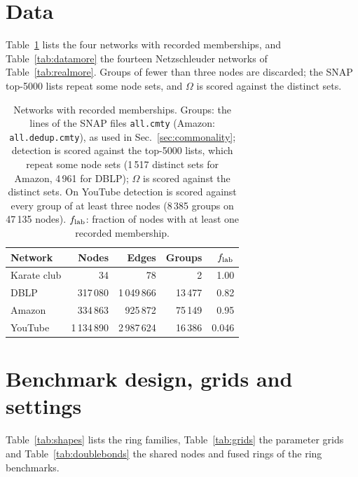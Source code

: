 \section{Data}
\label{app:data}

Table~\ref{tab:data} lists the four networks with recorded memberships, and
Table~\ref{tab:datamore} the fourteen Netzschleuder networks of Table~\ref{tab:realmore}.
Groups of fewer than three nodes are discarded; the SNAP top-5000 lists repeat some node
sets, and $\Omega$ is scored against the distinct sets.

\begin{table}[h]
\caption{Networks with recorded memberships. Groups: the lines of the SNAP files
\texttt{all.cmty} (Amazon: \texttt{all.dedup.cmty}), as used in Sec.~\ref{sec:commonality};
detection is scored against the top-5000 lists, which repeat some node sets (1\,517
distinct sets for Amazon, 4\,961 for DBLP); $\Omega$ is scored against the distinct
sets. On YouTube detection is scored against every group of at least three nodes
(8\,385 groups on 47\,135 nodes). $f_{\rm lab}$: fraction of nodes with at least one
recorded membership.}
\label{tab:data}
\begin{ruledtabular}
\begin{tabular}{lrrrr}
Network & Nodes & Edges & Groups & $f_{\rm lab}$ \\
\hline
Karate club & 34 & 78 & 2 & 1.00 \\
DBLP & 317\,080 & 1\,049\,866 & 13\,477 & 0.82 \\
Amazon & 334\,863 & 925\,872 & 75\,149 & 0.95 \\
YouTube & 1\,134\,890 & 2\,987\,624 & 16\,386 & 0.046 \\
\end{tabular}
\end{ruledtabular}
\end{table}



\section{Benchmark design, grids and settings}
\label{app:design}

Table~\ref{tab:shapes} lists the ring families, Table~\ref{tab:grids} the parameter grids
and Table~\ref{tab:doublebonds} the shared nodes and fused rings of the ring benchmarks.

